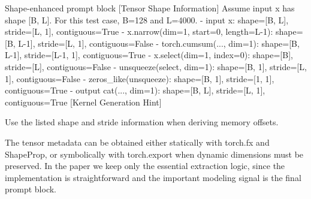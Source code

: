 \documentclass[
  10
]{article}
\newenvironment{Shaded}{}{}
\newcommand{\NormalTok}[1]{#1}
\begin{document}
\begin{Shaded}
\begin{Highlighting}[]
\NormalTok{Shape{-}enhanced prompt block}
\NormalTok{[Tensor Shape Information]}
\NormalTok{Assume input x has shape [B, L]. For this test case, B=128 and L=4000.}
\NormalTok{{-} input x: shape=[B, L], stride=[L, 1], contiguous=True}
\NormalTok{{-} x.narrow(dim=1, start=0, length=L{-}1): shape=[B, L{-}1], stride=[L, 1], contiguous=False}
\NormalTok{{-} torch.cumsum(..., dim=1): shape=[B, L{-}1], stride=[L{-}1, 1], contiguous=True}
\NormalTok{{-} x.select(dim=1, index=0): shape=[B], stride=[L], contiguous=False}
\NormalTok{{-} unsqueeze(select, dim=1): shape=[B, 1], stride=[L, 1], contiguous=False}
\NormalTok{{-} zeros\_like(unsqueeze): shape=[B, 1], stride=[1, 1], contiguous=True}
\NormalTok{{-} output cat(..., dim=1): shape=[B, L], stride=[L, 1], contiguous=True}
\NormalTok{[Kernel Generation Hint] }
\end{Highlighting}
\end{Shaded}

\begin{Shaded}
\begin{Highlighting}[]
\NormalTok{Use the listed shape and stride information when deriving memory offsets. }
\end{Highlighting}
\end{Shaded}

The tensor metadata can be obtained either statically with torch.fx and
ShapeProp, or symbolically with torch.export when dynamic dimensions
must be preserved. In the paper we keep only the essential extraction
logic, since the implementation is straightforward and the important
modeling signal is the final prompt block.
\end{document}
